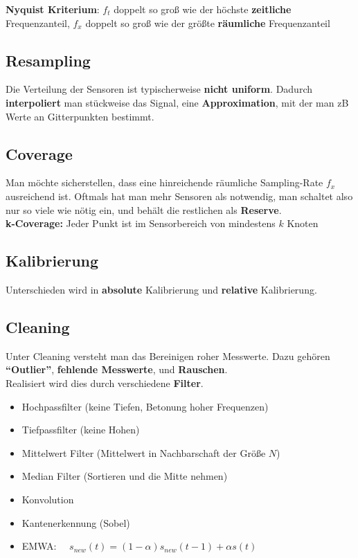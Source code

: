 \documentclass[a4paper]{article}
\begin{document}
\textbf{Nyquist Kriterium}: $f_t$ doppelt so groß wie der höchste \textbf{zeitliche} Frequenzanteil, $f_x$ doppelt so groß wie der größte \textbf{räumliche} Frequenzanteil
\subsection{Resampling}
Die Verteilung der Sensoren ist typischerweise\textbf{ nicht uniform}. Dadurch \textbf{interpoliert} man stückweise das Signal, eine \textbf{Approximation}, mit der man zB Werte an Gitterpunkten bestimmt.
\subsection{Coverage}
Man möchte sicherstellen, dass eine hinreichende räumliche Sampling-Rate $f_x$ ausreichend ist. Oftmals hat man mehr Sensoren als notwendig, man schaltet also nur so viele wie nötig ein, und behält die restlichen als \textbf{Reserve}.\\

\textbf{k-Coverage:} Jeder Punkt ist im Sensorbereich von mindestens $k$ Knoten
\subsection{Kalibrierung}
Unterschieden wird in \textbf{absolute} Kalibrierung und \textbf{relative} Kalibrierung.
\subsection{Cleaning}
Unter Cleaning versteht man das Bereinigen roher Messwerte. Dazu gehören \textbf{``Outlier''}, \textbf{fehlende Messwerte}, und \textbf{Rauschen}. \\

Realisiert	 wird dies durch verschiedene \textbf{Filter}. 
\begin{itemize}
	\item Hochpassfilter (keine Tiefen, Betonung hoher Frequenzen)
	\item Tiefpassfilter (keine Hohen)
	\item Mittelwert Filter (Mittelwert in Nachbarschaft der Größe $N$)
	\item Median Filter (Sortieren und die Mitte nehmen)
	\item Konvolution
	\item Kantenerkennung (Sobel)
	\item EMWA: \ \  $s_{new}(t) = (1-\alpha)s_{new}(t-1) + \alpha s(t)$
\end{itemize}
\end{document}
